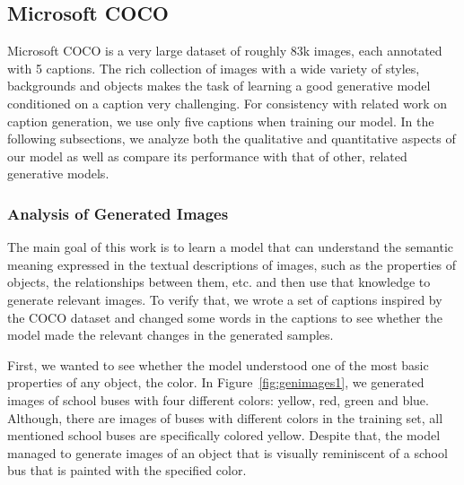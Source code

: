 \documentclass{article} %
\begin{document}
\subsection{Microsoft COCO}

Microsoft COCO \citep{mscoco} is a very large dataset of roughly 83k images, each annotated with 5 captions. The rich collection of images with a wide variety of styles, backgrounds and objects makes the task of learning a good generative model conditioned on a caption very challenging. For consistency with related work on caption generation, we use only five captions when training our model. In the following subsections, we analyze both the qualitative and quantitative aspects of our model as well as compare its performance with that of other, related generative models.

\subsubsection{Analysis of Generated Images}
The main goal of this work is to learn a model that can understand the semantic meaning expressed in the textual descriptions of images, such as the properties of objects, the relationships between them, etc. and then use that knowledge to generate relevant images. To verify that, we wrote a set of captions inspired by the COCO dataset and changed some words in the captions to see whether the model made the relevant changes in the generated samples.

First, we wanted to see whether the model understood one of the most basic properties of any object, the color. In Figure~\ref{fig:genimages1}, we generated images of school buses with four different colors: yellow, red, green and blue. Although, there are images of buses with different colors in the training set, all mentioned school buses are specifically colored yellow. Despite that, the model managed to generate images of an object that is visually reminiscent of a school bus that is painted with the specified color.
\end{document}

